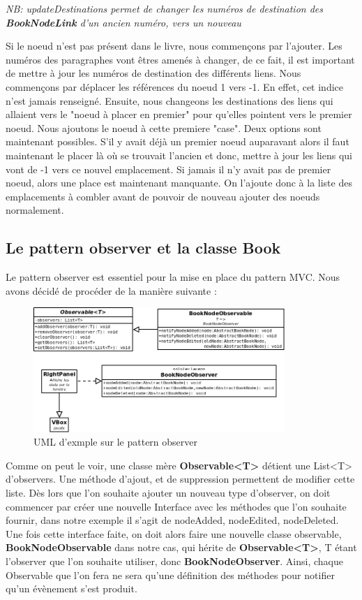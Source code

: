			\textit{NB: updateDestinations permet de changer les numéros de destination des \textbf{BookNodeLink} d'un ancien numéro, vers un nouveau}

			Si le noeud n'est pas présent dans le livre, nous commençons par l'ajouter. Les numéros des paragraphes vont êtres amenés à changer, de ce fait, il est important de mettre à jour les numéros de destination des différents liens. Nous commençons par déplacer les références du noeud 1 vers -1. En effet, cet indice n'est jamais renseigné. Ensuite, nous changeons les destinations des liens qui allaient vers le "noeud à placer en premier" pour qu'elles pointent vers le premier noeud. Nous ajoutons le noeud à cette premiere "case". Deux options sont maintenant possibles. S'il y avait déjà un premier noeud auparavant alors il faut maintenant le placer là où se trouvait l'ancien et donc, mettre à jour les liens qui vont de -1 vers ce nouvel emplacement. Si jamais il n'y avait pas de premier noeud, alors une place est maintenant manquante. On l'ajoute donc à la liste des emplacements à combler avant de pouvoir de nouveau ajouter des noeuds normalement.

		\subsection{Le pattern observer et la classe Book}
			\label{subsec:pattern_observer}

			Le pattern observer est essentiel pour la mise en place du pattern MVC. Nous avons décidé de procéder de la manière suivante :

			\begin{figure}[H]
				\centering\includegraphics[width=0.85\textwidth, keepaspectratio]{img/observer.png}
				\caption{UML d'exmple sur le pattern observer}
			\end{figure}

			Comme on peut le voir, une classe mère \textbf{Observable<T>} détient une List<T> d'observers. Une méthode d'ajout, et de suppression permettent de modifier cette liste. Dès lors que l'on souhaite ajouter un nouveau type d'observer, on doit commencer par créer une nouvelle Interface avec les méthodes que l'on souhaite fournir, dans notre exemple il s'agit de nodeAdded, nodeEdited, nodeDeleted. Une fois cette interface faite, on doit alors faire une nouvelle classe observable, \textbf{BookNodeObservable} dans notre cas, qui hérite de \textbf{Observable<T>}, T étant l'observer que l'on souhaite utiliser, donc \textbf{BookNodeObserver}. Ainsi, chaque Observable que l'on fera ne sera qu'une définition des méthodes pour notifier qu'un évènement s'est produit.

